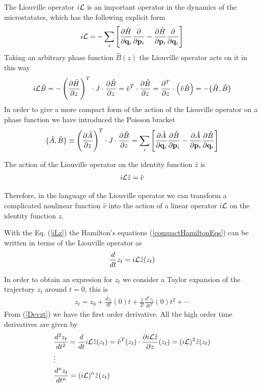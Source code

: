 \documentclass[a4paper,openright,12pt]{book}
\begin{document}
The Liouville operator $i{\cal L}$ is an important operator in the dynamics of the microstatates, which has the following explicit form 
\begin{equation}
    i{\cal L} = -
    \sum_i\left[\frac{\partial \hat{H}}{\partial {\bf q}_i}
\frac{\partial    }{\partial {\bf p}_i}-
\frac{\partial \hat{H}}{\partial {\bf p}_i}
\frac{\partial }{\partial {\bf q}_i}\right]
\label{iL}
\end{equation}
Taking an arbitrary phase function $\hat{B}(z)$ the Liouville operator acts on it in this way
\begin{align}
  i{\cal L}\hat{B}=-\left(\frac{\partial\hat{H}}{\partial z}\right)^T\cdot J\cdot\frac{\partial\hat{B}}{\partial z}
  =\hat{v}^T\cdot\frac{\partial\hat{B}}{\partial z}
  = \frac{\partial^T}{\partial z}\cdot\left(\hat{v}\hat{B}\right) 
  = -\{\hat{H},\hat{B}\}
  \label{iLB}
\end{align}
In order to give a more compact form of the action of the Liouville operator on a phase function we have introduced the Poisson bracket
\begin{align}
  \{\hat{A},\hat{B}\}\equiv\left(\frac{\partial\hat{A}}{\partial z}\right)^T\cdot J\cdot\frac{\partial\hat{B}}{\partial z}= 
  \sum_i\left[\frac{\partial \hat{A}}{\partial {\bf q}_i}
    \frac{\partial \hat{B}}{\partial {\bf p}_i}-          
    \frac{\partial \hat{A}}{\partial {\bf p}_i}
  \frac{\partial\hat{B} }{\partial {\bf q}_i}\right]
    \label{PoissonBracket}
\end{align}

The action of the Liouville operator on the identity function $\hat{z}$ is
\begin{align}
  i{\cal L} \hat{z} = \hat{v}
  \label{iLz}
\end{align}

Therefore, in the language of the Liouville operator we can transform a complicated nonlinear function $\hat{v}$ into the action of a linear operator $i{\cal L}$ on the identity function $z$.

With the Eq. (\ref{iLz}) the Hamilton's equations (\ref{compactHamiltonEqs}) can be written in terms of the Liouville operator as
\begin{align}
  \frac{d}{dt}z_t=i{\cal L}\hat{z}(z_t)
  \label{Devzt}
\end{align}

In order to obtain an expresion for $z_t$ we consider a Taylor expansion of the trajectory $z_t$ around $t=0$, this is
\begin{align}
    z_t=z_0+\frac{dz_t}{dt}(0)t+\frac{1}{2!}\frac{d^2z_t}{dt^2}(0)t^2+\cdots
    \label{ztExp}
\end{align}
From (\ref{Devzt}) we have the first order derivative. All the high order time derivatives are given by
\begin{align}
    &\frac{d^2z_t}{dt^2} = \frac{d}{dt}i{\cal L}\hat{z}(z_t)
    =\hat{v}^T(z_t)\cdot\frac{\partial i{\cal L}\hat{z}}{\partial z}(z_t)
    =(i{\cal L})^2\hat{z}(z_t) \nonumber \\ 
    &\vdots \nonumber \\ 
    &\frac{d^n z_t}{dt^n} =(i{\cal L})^n\hat{z}(z_t)
\end{align}
\end{document}
